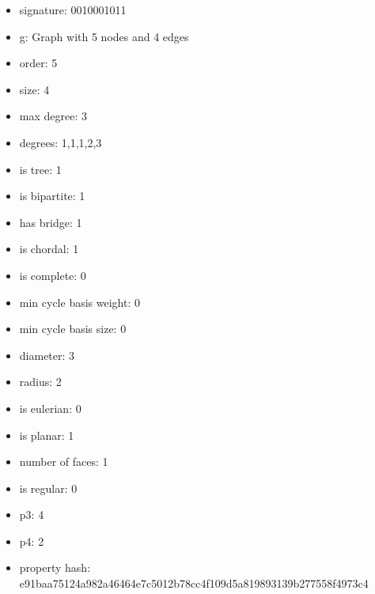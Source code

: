 \begin{itemize}
\item signature: 0010001011
\item g: Graph with 5 nodes and 4 edges
\item order: 5
\item size: 4
\item max degree: 3
\item degrees: 1,1,1,2,3
\item is tree: 1
\item is bipartite: 1
\item has bridge: 1
\item is chordal: 1
\item is complete: 0
\item min cycle basis weight: 0
\item min cycle basis size: 0
\item diameter: 3
\item radius: 2
\item is eulerian: 0
\item is planar: 1
\item number of faces: 1
\item is regular: 0
\item p3: 4
\item p4: 2
\item property hash: e91baa75124a982a46464e7c5012b78cc4f109d5a819893139b277558f4973c4
\end{itemize}
\newpage
\begin{figure}
\end{figure}
